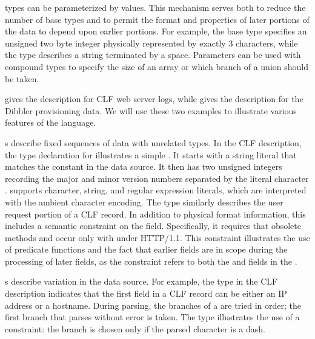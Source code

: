 \documentclass{sig-alternate}
\begin{document}
\pads{} types can be parameterized by values.
This mechanism
serves both to reduce the number of base types and to permit the
format and properties of later portions of the data to depend upon earlier portions.
For example, 
the base type  specifies an unsigned two byte integer
physically represented by exactly 3 characters, while the type
describes a string terminated by a space.  Parameters can be 
used with compound types to specify the size of an array or which
branch of a union should be taken.

 gives the \pads{} description for CLF web server logs, 
while  gives the description for the Dibbler 
provisioning data.  We will use these two examples to illustrate various 
features of the \pads{} language. 

s describe fixed sequences of data with unrelated types.
In the CLF description, the type declaration for
 illustrates a simple . It starts with a 
string literal that matches the constant  in the data source.  It 
then has two unsigned integers recording the major and minor version numbers
separated by the literal character .  \pads{} supports character, string,
and regular expression literals, which are interpreted with the ambient character 
encoding. The type  
similarly describes the user request portion of a CLF record.  In addition
to physical format information, this  includes a semantic constraint
on the  field.  Specifically, it requires that obsolete methods
 and  occur only with under HTTP/1.1.  This constraint illustrates
the use of predicate functions and the fact 
that earlier fields are in scope during the processing of later fields, as the 
constraint
refers to both the  and  fields in the .

s describe variation in the data source.  For example, the
 type in the CLF description indicates that the first field 
in a CLF record can be either an IP address or a hostname.  During parsing, 
the branches of a  are tried in order; the first branch that 
parses without error is taken.  The  type illustrates the use
of a constraint: the branch  is chosen only if the parsed
character is a dash.  
\end{document}
